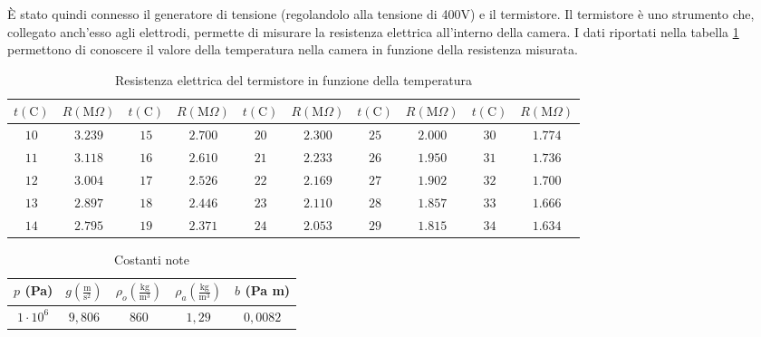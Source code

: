 \documentclass{article}
\begin{document}
\vspace{5mm}

È stato quindi connesso il generatore di tensione (regolandolo alla tensione di 400V) e il termistore. Il termistore è uno strumento che, collegato anch'esso agli elettrodi, permette di misurare la resistenza elettrica all'interno della camera. I dati riportati nella tabella \ref{TabRes} permettono di conoscere il valore della temperatura nella camera in funzione della resistenza misurata.

\begin{table}[h!]
\centering
\begin{tabular}{ || c | c || c | c || c | c || c | c || c | c || }
  \hline
  $t (\textrm{C})$ & $R (\textrm{M} \Omega)$ & $t (\textrm{C})$ & $R (\textrm{M} \Omega)$ & $t (\textrm{C})$ & $R (\textrm{M} \Omega)$ & $t (\textrm{C})$ & $R (\textrm{M} \Omega)$ & $t (\textrm{C})$ & $R (\textrm{M} \Omega)$ \\
  \hline
  \hline
  $10$ & $3.239$ & $15$ & $2.700$ & $20$ & $2.300$ & $25$ & $2.000$ & $30$ & $1.774$ \\
  $11$ & $3.118$ & $16$ & $2.610$ & $21$ & $2.233$ & $26$ & $1.950$ & $31$ & $1.736$ \\
  $12$ & $3.004$ & $17$ & $2.526$ & $22$ & $2.169$ & $27$ & $1.902$ & $32$ & $1.700$ \\
  $13$ & $2.897$ & $18$ & $2.446$ & $23$ & $2.110$ & $28$ & $1.857$ & $33$ & $1.666$ \\
  $14$ & $2.795$ & $19$ & $2.371$ & $24$ & $2.053$ & $29$ & $1.815$ & $34$ & $1.634$ \\
  \hline
\end{tabular}
  \caption{Resistenza elettrica del termistore in funzione della temperatura}
  \label{TabRes}
\end{table}

\begin{table}[h!]
\centering
\begin{tabular}{ | c | c | c | c | c | }
  \hline
  $p$ (Pa) & $g (\frac{\textrm{m}}{\textrm{s}^2})$ & $\rho _o (\frac{\textrm{kg}}{\textrm{m}^3})$ & $\rho _a (\frac{\textrm{kg}}{\textrm{m}^3})$ & $b$ (Pa m) \\
  \hline
  $1 \cdot 10^6$ & $9,806$ & $860$ & $1,29$ & $0,0082$ \\
  \hline
\end{tabular}
  \caption{Costanti note}
  \label{TabCos}
\end{table}

\pagebreak
\end{document}
